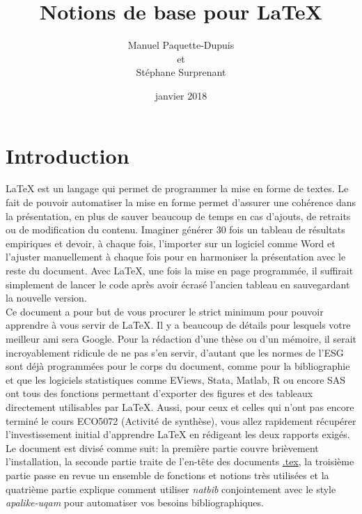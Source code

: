 \documentclass[12pt]{article}
\title{Notions de base pour LaTeX}
\author{Manuel Paquette-Dupuis \\
	et \\
	Stéphane Surprenant}
\date{janvier 2018}
\begin{document}
 
	\maketitle
	\thispagestyle{empty}
	
	\newpage
	\tableofcontents
	
	\newpage
	\section*{Introduction}
	\doublespacing
	
	LaTeX est un langage qui permet de programmer la mise en forme de textes. Le fait de pouvoir automatiser la mise en forme permet d'assurer une cohérence dans la présentation, en plus de sauver beaucoup de temps en cas d'ajouts, de retraits ou de modification du contenu. Imaginer générer 30 fois un tableau de résultats empiriques et devoir, à chaque fois, l'importer sur un logiciel comme Word et l'ajuster manuellement à chaque fois pour en harmoniser la présentation avec le reste du document. Avec LaTeX, une fois la mise en page programmée, il suffirait simplement de lancer le code après avoir écrasé l'ancien tableau en sauvegardant la nouvelle version. \\ 
	
	Ce document a pour but de vous procurer le strict minimum pour pouvoir apprendre à vous servir de LaTeX. Il y a beaucoup de détails pour lesquels votre meilleur ami sera Google. Pour la rédaction d'une thèse ou d'un mémoire, il serait incroyablement ridicule de ne pas s'en servir, d'autant que les normes de l'ESG sont déjà programmées pour le corps du document, comme pour la bibliographie et que les logiciels statistiques comme EViews, Stata, Matlab, R ou encore SAS ont tous des fonctions permettant d'exporter des figures et des tableaux directement utilisables par LaTeX. Aussi, pour ceux et celles qui n'ont pas encore terminé le cours ECO5072 (Activité de synthèse), vous allez rapidement récupérer l'investissement initial d'apprendre LaTeX en rédigeant les deux rapports exigés. \\
	
	Le document est divisé comme suit: la première partie couvre brièvement l'installation, la seconde partie traite de l'en-tête des documents \url{.tex}, la troisième partie passe en revue un ensemble de fonctions et notions très utilisées et la quatrième partie explique comment utiliser \textit{natbib} conjointement avec le style \textit{apalike-uqam} pour automatiser vos besoins bibliographiques.
	
\end{document}
